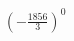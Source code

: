 \documentclass[preview]{standalone}
\begin{document}
\begin{align*}
\left( -\frac{1856}{3} \right)^{0}
\end{align*}
\end{document}

